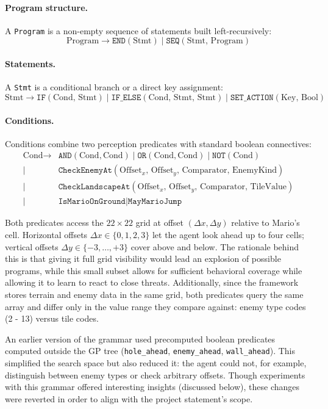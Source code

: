\documentclass[runningheads]{llncs}
\begin{document}
\paragraph{Program structure.}
A \texttt{Program} is a non-empty sequence of statements built left-recursively:
\[
\text{Program} \to \texttt{END}(\text{Stmt}) \mid \texttt{SEQ}(\text{Stmt},\,\text{Program})
\]

\paragraph{Statements.}
A \texttt{Stmt} is a conditional branch or a direct key assignment:
\[
\text{Stmt} \to \texttt{IF}(\text{Cond},\,\text{Stmt}) \mid \texttt{IF\_ELSE}(\text{Cond},\,\text{Stmt},\,\text{Stmt}) \mid \texttt{SET\_ACTION}(\text{Key},\,\text{Bool})
\]

\paragraph{Conditions.}
Conditions combine two perception predicates with standard boolean connectives:
\begin{align*}
\text{Cond} \to{}& \texttt{AND}(\text{Cond},\text{Cond}) \mid \texttt{OR}(\text{Cond},\text{Cond}) \mid \texttt{NOT}(\text{Cond}) \\
  \mid{}& \texttt{CheckEnemyAt}(\text{Offset}_x,\,\text{Offset}_y,\,\text{Comparator},\,\text{EnemyKind}) \\
  \mid{}& \texttt{CheckLandscapeAt}(\text{Offset}_x,\,\text{Offset}_y,\,\text{Comparator},\,\text{TileValue}) \\
  \mid{}& \texttt{IsMarioOnGround} \mid \texttt{MayMarioJump}
\end{align*}

Both predicates access the $22\times22$ grid at offset $(\Delta x, \Delta y)$ relative to Mario's cell. Horizontal offsets $\Delta x \in \{0,1,2,3\}$ let the agent look ahead up to four cells; vertical offsets $\Delta y \in \{-3,\ldots,+3\}$ cover above and below. The rationale behind this is that giving it full grid visibility would lead an explosion of possible programs, while this small subset allows for sufficient behavioral coverage while allowing it to learn to react to close threats. Additionally, since the framework stores terrain and enemy data in the same grid, both predicates query the same array and differ only in the value range they compare against: enemy type codes (2 - 13) versus tile codes.

An earlier version of the grammar used precomputed boolean predicates computed outside the GP tree (\texttt{hole\_ahead}, \texttt{enemy\_ahead}, \texttt{wall\_ahead}). This simplified the search space but also reduced it: the agent could not, for example, distinguish between enemy types or check arbitrary offsets. Though experiments with this grammar offered interesting insights (discussed below), these changes were reverted in order to align with the project statement's scope.
\end{document}
